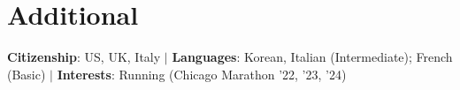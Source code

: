 \documentclass[letterpaper,10pt]{article}
\begin{document}
\section{Additional}
 \begin{itemize}[leftmargin=0.015in, label={}]
    \small{\item{
     \textbf{Citizenship}: US, UK, Italy $|$ \textbf{Languages}: Korean, Italian (Intermediate); French (Basic) $|$ \textbf{Interests}: Running (Chicago Marathon '22, '23, '24)
    }}
 \end{itemize}
\end{document}
